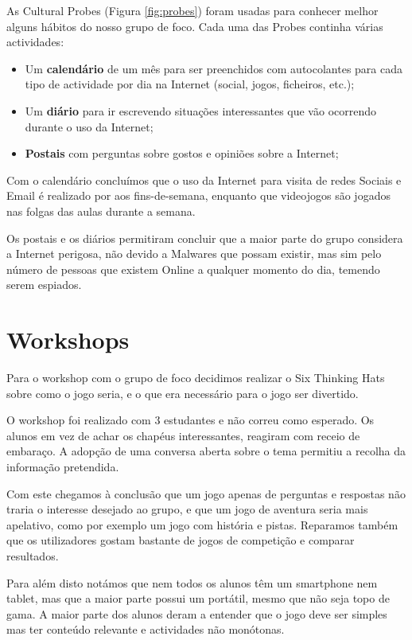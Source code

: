 As Cultural Probes (Figura \ref{fig:probes}) foram usadas para conhecer melhor alguns hábitos do nosso grupo de foco. Cada uma das Probes continha várias actividades:
\begin{itemize}
\item Um \textbf{calendário} de um mês para ser preenchidos com autocolantes para cada tipo de actividade por dia na Internet (social, jogos, ficheiros, etc.);
\item Um \textbf{diário} para ir escrevendo situações interessantes que vão ocorrendo durante o uso da Internet;
\item \textbf{Postais} com perguntas sobre gostos e opiniões sobre a Internet;
\end{itemize}

Com o calendário concluímos que o uso da Internet para visita de redes Sociais e Email é realizado por aos fins-de-semana, enquanto que videojogos são jogados nas folgas das aulas durante a semana.

Os postais e os diários permitiram concluir que a maior parte do grupo considera a Internet perigosa, não devido a Malwares que possam existir, mas sim pelo número de pessoas que existem Online a qualquer momento do dia, temendo serem espiados.

\section{Workshops}
\label{sec:work}

Para o workshop com o grupo de foco decidimos realizar o Six Thinking Hats sobre como o jogo seria, e o que era necessário para o jogo ser divertido.

O workshop foi realizado com 3 estudantes e não correu como esperado. Os alunos em vez de achar os chapéus interessantes, reagiram com receio de embaraço. A adopção de uma conversa aberta sobre o tema permitiu a recolha da informação pretendida.

Com este chegamos à conclusão que um jogo apenas de perguntas e respostas não traria o interesse desejado ao grupo, e que um jogo de aventura seria mais apelativo, como por exemplo um jogo com história e pistas. Reparamos também que os utilizadores gostam bastante de jogos de competição e comparar resultados.

Para além disto notámos que nem todos os alunos têm um smartphone nem tablet, mas que a maior parte possui um portátil, mesmo que não seja topo de gama.
A maior parte dos alunos deram a entender que o jogo deve ser simples mas ter conteúdo relevante e actividades não monótonas.

